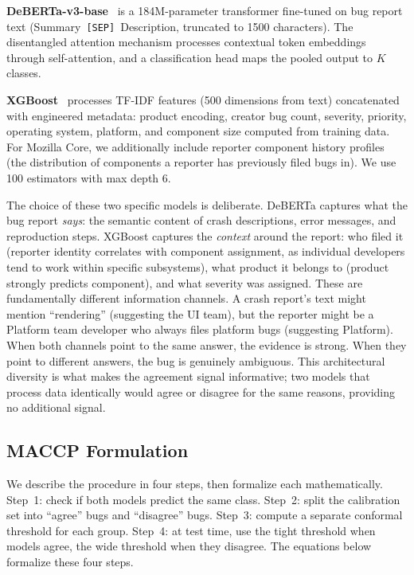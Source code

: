 \documentclass[conference]{IEEEtran}
\begin{document}
\textbf{DeBERTa-v3-base}~\cite{he2021deberta} is a 184M-parameter transformer fine-tuned on bug report text (Summary~\texttt{[SEP]}~Description, truncated to 1500 characters). The disentangled attention mechanism processes contextual token embeddings through self-attention, and a classification head maps the pooled output to $K$ classes.

\textbf{XGBoost}~\cite{chen2016xgboost} processes TF-IDF features (500 dimensions from text) concatenated with engineered metadata: product encoding, creator bug count, severity, priority, operating system, platform, and component size computed from training data. For Mozilla Core, we additionally include reporter component history profiles (the distribution of components a reporter has previously filed bugs in). We use 100 estimators with max depth 6.

The choice of these two specific models is deliberate. DeBERTa captures what the bug report \emph{says}: the semantic content of crash descriptions, error messages, and reproduction steps. XGBoost captures the \emph{context} around the report: who filed it (reporter identity correlates with component assignment, as individual developers tend to work within specific subsystems), what product it belongs to (product strongly predicts component), and what severity was assigned. These are fundamentally different information channels. A crash report's text might mention ``rendering'' (suggesting the UI team), but the reporter might be a Platform team developer who always files platform bugs (suggesting Platform). When both channels point to the same answer, the evidence is strong. When they point to different answers, the bug is genuinely ambiguous. This architectural diversity is what makes the agreement signal informative; two models that process data identically would agree or disagree for the same reasons, providing no additional signal.

\subsection{MACCP Formulation}\label{sec:maccp-formulation}

We describe the procedure in four steps, then formalize each mathematically. Step~1: check if both models predict the same class. Step~2: split the calibration set into ``agree'' bugs and ``disagree'' bugs. Step~3: compute a separate conformal threshold for each group. Step~4: at test time, use the tight threshold when models agree, the wide threshold when they disagree. The equations below formalize these four steps.
\end{document}
